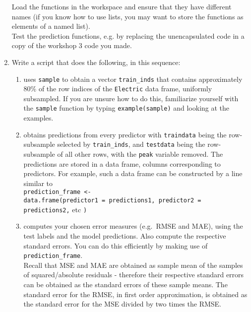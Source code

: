 \begin{enumerate}
Load the functions in the workspace and ensure that they have different names (if you know how to use lists, you may want to store the functions as elements of a named list).\\
Test the prediction functions, e.g. by replacing the unencapsulated code in a copy of the workshop 3 code you made.\newpage

\item Write a script that does the following, in this sequence:\\ 
\begin{enumerate}
    \item uses \texttt{sample} to obtain a vector \texttt{train\_inds} that contains approximately 80\% of the row indices of the \texttt{Electric} data frame, uniformly subsampled. If you are unsure how to do this, familiarize yourself with the \texttt{sample} function by typing \texttt{example(sample)} and looking at the examples.\\
    \item obtains predictions from every predictor with \texttt{traindata} being the row-subsample selected by \texttt{train\_inds}, and \texttt{testdata} being the row-subsample of all other rows, with the \texttt{peak} variable removed. The predictions are stored in a data frame, columns corresponding to predictors. For example, such a data frame can be constructed by a line similar to\\
    \texttt{prediction\_frame <-\\ 
     data.frame(predictor1 = predictions1, predictor2 = predictions2,} etc \texttt{)}\\
    \item computes your chosen error measures (e.g.~RMSE and MAE), using the test labels and the model predictions. Also compute the respective standard errors. You can do this efficiently by making use of \texttt{prediction\_frame}.\\
    Recall that MSE and MAE are obtained as sample mean of the samples of squared/absolute residuals - therefore their respective standard errors can be obtained as the standard errors of these sample means. The standard error for the RMSE, in first order approximation, is obtained as the standard error for the MSE divided by two times the RMSE.
    \end{enumerate}


\end{enumerate}
